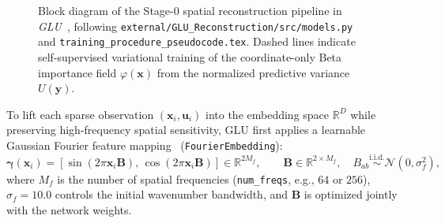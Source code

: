 \begin{figure}[H]
{%
    }
    \caption[Stage-0 architectural diagram of the Global-Local-Uncertainty (GLU) framework]{Block diagram of the Stage-0 spatial reconstruction pipeline in \textit{GLU}~\cite{wang2026glu}, following \texttt{external/GLU\_Reconstruction/src/models.py} and \texttt{training\_procedure\_pseudocode.tex}. Dashed lines indicate self-supervised variational training of the coordinate-only Beta importance field $\varphi(\mathbf{x})$ from the normalized predictive variance $U(\mathbf{y})$.}
    \label{fig:bg_glu_arch}
\end{figure}

To lift each sparse observation $(\mathbf{x}_i, \mathbf{u}_i)$ into the embedding space $\mathbb{R}^D$ while preserving high-frequency spatial sensitivity, GLU first applies a learnable Gaussian Fourier feature mapping~\cite{tancik2020fourier} (\texttt{FourierEmbedding}):
\begin{equation}
    \boldsymbol{\gamma}(\mathbf{x}_i) = \left[\sin(2\pi \mathbf{x}_i \mathbf{B}),\, \cos(2\pi \mathbf{x}_i \mathbf{B})\right] \in \mathbb{R}^{2M_f}, \qquad \mathbf{B} \in \mathbb{R}^{2 \times M_f}, \quad B_{ab} \stackrel{\text{i.i.d.}}{\sim} \mathcal{N}(0, \sigma_f^2),
    \label{eq:bg_glu_fourier}
\end{equation}
where $M_f$ is the number of spatial frequencies (\texttt{num\_freqs}, e.g., $64$ or $256$), $\sigma_f = 10.0$ controls the initial wavenumber bandwidth, and $\mathbf{B}$ is optimized jointly with the network weights.

